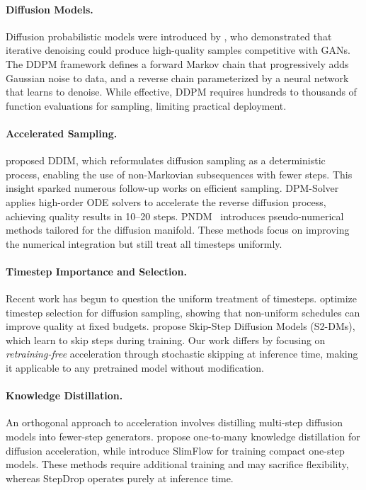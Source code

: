 \documentclass{article}
\begin{document}
\paragraph{Diffusion Models.} Diffusion probabilistic models were introduced by \citet{ho2020denoising}, who demonstrated that iterative denoising could produce high-quality samples competitive with GANs. The DDPM framework defines a forward Markov chain that progressively adds Gaussian noise to data, and a reverse chain parameterized by a neural network that learns to denoise. While effective, DDPM requires hundreds to thousands of function evaluations for sampling, limiting practical deployment.

\paragraph{Accelerated Sampling.} \citet{song2020denoising} proposed DDIM, which reformulates diffusion sampling as a deterministic process, enabling the use of non-Markovian subsequences with fewer steps. This insight sparked numerous follow-up works on efficient sampling. DPM-Solver~\citep{lu2022dpm} applies high-order ODE solvers to accelerate the reverse diffusion process, achieving quality results in 10--20 steps. PNDM~\citep{liu2022pseudo} introduces pseudo-numerical methods tailored for the diffusion manifold. These methods focus on improving the numerical integration but still treat all timesteps uniformly.

\paragraph{Timestep Importance and Selection.} Recent work has begun to question the uniform treatment of timesteps. \citet{xue2024accelerating} optimize timestep selection for diffusion sampling, showing that non-uniform schedules can improve quality at fixed budgets. \citet{wang2024s2dms} propose Skip-Step Diffusion Models (S2-DMs), which learn to skip steps during training. Our work differs by focusing on \emph{retraining-free} acceleration through stochastic skipping at inference time, making it applicable to any pretrained model without modification.

\paragraph{Knowledge Distillation.} An orthogonal approach to acceleration involves distilling multi-step diffusion models into fewer-step generators. \citet{zhang2024accelerating} propose one-to-many knowledge distillation for diffusion acceleration, while \citet{zhu2024slimflow} introduce SlimFlow for training compact one-step models. These methods require additional training and may sacrifice flexibility, whereas StepDrop operates purely at inference time.
\end{document}
